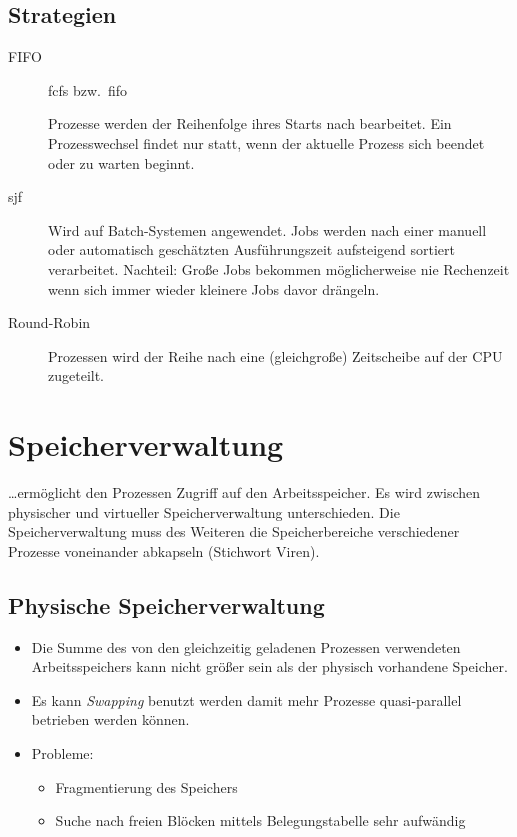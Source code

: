 \subsection{Strategien}
\begin{description}
  \item [FIFO] 
	\gls{fcfs} bzw.~\gls{fifo} 

	Prozesse werden der Reihenfolge ihres Starts nach bearbeitet.
	Ein Prozesswechsel findet nur statt, wenn der aktuelle Prozess sich beendet oder zu warten beginnt.

  \item [\gls{sjf}] 
	Wird auf Batch-Systemen angewendet.
	Jobs werden nach einer manuell oder automatisch geschätzten Ausführungszeit aufsteigend sortiert verarbeitet.
	Nachteil: Große Jobs bekommen möglicherweise nie Rechenzeit wenn sich immer wieder kleinere Jobs davor drängeln.

  \item [{Round-Robin}] 
	Prozessen wird der Reihe nach eine (gleichgroße) Zeitscheibe auf der CPU zugeteilt.
\end{description}

\section{Speicherverwaltung}

\ldots{}ermöglicht den Prozessen Zugriff auf den Arbeitsspeicher.
Es wird zwischen physischer und virtueller Speicherverwaltung unterschieden.
Die Speicherverwaltung muss des Weiteren die Speicherbereiche verschiedener Prozesse voneinander abkapseln (Stichwort Viren).


\subsection{Physische Speicherverwaltung}
\begin{itemize}
  \item {}
	Die Summe des von den gleichzeitig geladenen Prozessen verwendeten Arbeitsspeichers kann nicht größer sein als der physisch vorhandene Speicher.
  \item {}
	Es kann \emph{Swapping} benutzt werden damit mehr Prozesse quasi-parallel betrieben werden können.
  \item Probleme:
      \begin{itemize}
	\item {}Fragmentierung des Speichers
	\item Suche nach freien Blöcken mittels Belegungstabelle sehr aufwändig
      \end{itemize}
\end{itemize}

